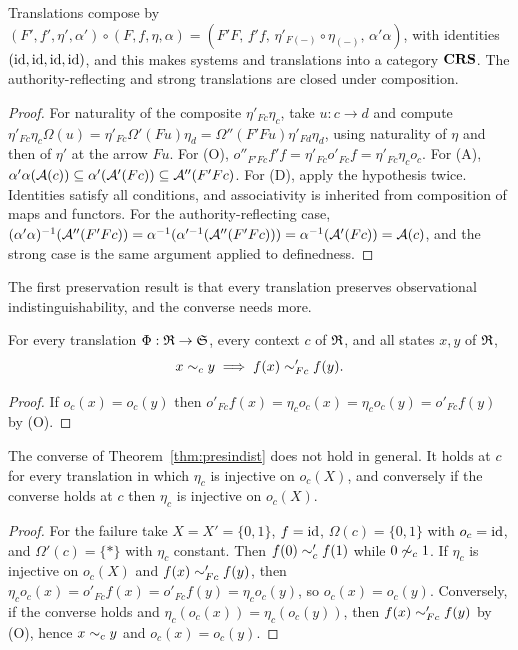 \begin{proposition}\label{prop:crs}
Translations compose by $(F',f',\eta',\alpha')\circ(F,f,\eta,\alpha)=(F'F,\,f'f,\,\eta'_{F(-)}\circ\eta_{(-)},\,\alpha'\alpha)$, with identities $(\mathrm{id},\mathrm{id},\mathrm{id},\mathrm{id})$, and this makes systems and translations into a category $\mathbf{CRS}$. The authority-reflecting and strong translations are closed under composition.
\end{proposition}
\begin{proof}
For naturality of the composite $\eta'_{Fc}\eta_c$, take $u:c\to d$ and compute $\eta'_{Fc}\eta_c\Omega(u)=\eta'_{Fc}\Omega'(Fu)\eta_d=\Omega''(F'Fu)\eta'_{Fd}\eta_d$, using naturality of $\eta$ and then of $\eta'$ at the arrow $Fu$. For (O), $o''_{F'Fc}f'f=\eta'_{Fc}o'_{Fc}f=\eta'_{Fc}\eta_co_c$. For (A), $\alpha'\alpha(\mathcal A(c))\subseteq\alpha'(\mathcal A'(Fc))\subseteq\mathcal A''(F'Fc)$. For (D), apply the hypothesis twice. Identities satisfy all conditions, and associativity is inherited from composition of maps and functors. For the authority-reflecting case, $(\alpha'\alpha)^{-1}(\mathcal A''(F'Fc))=\alpha^{-1}(\alpha'^{-1}(\mathcal A''(F'Fc)))=\alpha^{-1}(\mathcal A'(Fc))=\mathcal A(c)$, and the strong case is the same argument applied to definedness.
\end{proof}

The first preservation result is that every translation preserves observational indistinguishability, and the converse needs more.

\begin{theorem}\label{thm:presindist}
For every translation $\Phi:\mathfrak R\to\mathfrak S$, every context $c$ of $\mathfrak R$, and all states $x,y$ of $\mathfrak R$,
\[
x\sim_c y\;\Longrightarrow\;f(x)\sim'_{Fc}f(y).
\]
\end{theorem}
\begin{proof}
If $o_c(x)=o_c(y)$ then $o'_{Fc}f(x)=\eta_co_c(x)=\eta_co_c(y)=o'_{Fc}f(y)$ by (O).
\end{proof}

\begin{proposition}\label{prop:reflection}
The converse of Theorem~\ref{thm:presindist} does not hold in general. It holds at $c$ for every translation in which $\eta_c$ is injective on $o_c(X)$, and conversely if the converse holds at $c$ then $\eta_c$ is injective on $o_c(X)$.
\end{proposition}
\begin{proof}
For the failure take $X=X'=\{0,1\}$, $f=\mathrm{id}$, $\Omega(c)=\{0,1\}$ with $o_c=\mathrm{id}$, and $\Omega'(c)=\{\ast\}$ with $\eta_c$ constant. Then $f(0)\sim'_cf(1)$ while $0\not\sim_c1$. If $\eta_c$ is injective on $o_c(X)$ and $f(x)\sim'_{Fc}f(y)$, then $\eta_co_c(x)=o'_{Fc}f(x)=o'_{Fc}f(y)=\eta_co_c(y)$, so $o_c(x)=o_c(y)$. Conversely, if the converse holds and $\eta_c(o_c(x))=\eta_c(o_c(y))$, then $f(x)\sim'_{Fc}f(y)$ by (O), hence $x\sim_cy$ and $o_c(x)=o_c(y)$.
\end{proof}


